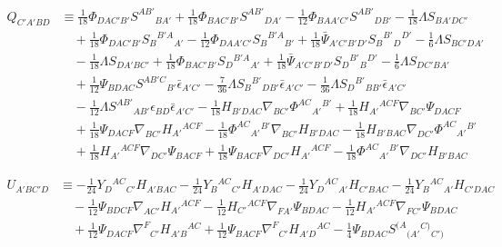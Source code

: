 \documentclass[10pt,a4paper]{article}
\theoremstyle{plain}
\begin{document}
\begin{align} 
Q_{C'A'BD} &\equiv \tfrac{1}{18} \Phi_{DAC'B'} S^{AB'}{}_{BA'} +
\tfrac{1}{18} \Phi_{BAC'B'} S^{AB'}{}_{DA'} - \tfrac{1}{12}
\Phi_{BAA'C'} S^{AB'}{}_{DB'} - \tfrac{1}{18} \Lambda S_{BA'DC'}
\nonumber \\ & \quad + \tfrac{1}{18} \Phi_{DAC'B'}
S_{B}{}^{B'A}{}_{A'} - \tfrac{1}{12} \Phi_{DAA'C'}
S_{B}{}^{B'A}{}_{B'} + \tfrac{1}{18} \bar{\Psi}_{A'C'B'D'}
S_{B}{}^{B'}{}_{D}{}^{D'} - \tfrac{1}{6} \Lambda S_{BC'DA'} \nonumber
\\ & \quad - \tfrac{1}{18} \Lambda S_{DA'BC'} + \tfrac{1}{18}
\Phi_{BAC'B'} S_{D}{}^{B'A}{}_{A'} + \tfrac{1}{18}
\bar{\Psi}_{A'C'B'D'} S_{D}{}^{B'}{}_{B}{}^{D'} - \tfrac{1}{6} \Lambda
S_{DC'BA'} \nonumber \\ & \quad + \tfrac{1}{12} \Psi_{BDAC}
S^{AB'C}{}_{B'} \bar{\epsilon}_{A'C'} - \tfrac{7}{36} \Lambda
S_{B}{}^{B'}{}_{DB'} \bar{\epsilon}_{A'C'} - \tfrac{1}{36} \Lambda
S_{D}{}^{B'}{}_{BB'} \bar{\epsilon}_{A'C'} \nonumber \\ & \quad -
\tfrac{1}{12} \Lambda S^{AB'}{}_{AB'}
\epsilon_{BD}\bar{\epsilon}_{A'C'} - \tfrac{1}{18} H_{B'DAC}
\nabla_{BC'}\Phi^{AC}{}_{A'}{}^{B'} + \tfrac{1}{18} H_{A'}{}^{ACF}
\nabla_{BC'}\Psi_{DACF} \nonumber \\ & \quad + \tfrac{1}{18}
\Psi_{DACF} \nabla_{BC'}H_{A'}{}^{ACF} - \tfrac{1}{18}
\Phi^{AC}{}_{A'}{}^{B'} \nabla_{BC'}H_{B'DAC} -\tfrac{1}{18} H_{B'BAC}
\nabla_{DC'}\Phi^{AC}{}_{A'}{}^{B'} \nonumber \\ & \quad +
\tfrac{1}{18} H_{A'}{}^{ACF} \nabla_{DC'}\Psi_{BACF} + \tfrac{1}{18}
\Psi_{BACF} \nabla_{DC'}H_{A'}{}^{ACF} - \tfrac{1}{18}
\Phi^{AC}{}_{A'}{}^{B'} \nabla_{DC'}H_{B'BAC} \nonumber
\end{align}

\begin{align}
 U_{A'BC'D} & \equiv - \tfrac{1}{24} Y_{D}{}^{AC}{}_{C'} H_{A'BAC} -
 \tfrac{1}{24} Y_{B}{}^{AC}{}_{C'} H_{A'DAC} - \tfrac{1}{24}
 Y_{D}{}^{AC}{}_{A'} H_{C'BAC} - \tfrac{1}{24} Y_{B}{}^{AC}{}_{A'}
 H_{C'DAC}  \nonumber \\ & \quad - \tfrac{1}{12} \Psi_{BDCF}
 \nabla_{AC'}H_{A'}{}^{ACF} - \tfrac{1}{12} H_{C'}{}^{ACF}
 \nabla_{FA'}\Psi_{BDAC} - \tfrac{1}{12} H_{A'}{}^{ACF}
 \nabla_{FC'}\Psi_{BDAC} \nonumber \\ & \quad + \tfrac{1}{12}
 \Psi_{DACF} \nabla^{F}{}_{C'}H_{A'B}{}^{AC} + \tfrac{1}{12}
 \Psi_{BACF} \nabla^{F}{}_{C'}H_{A'D}{}^{AC} - \tfrac{1}{4}
 \Psi_{BDAC} S^{(A}{}_{(A'}{}^{C)}{}_{C')}\nonumber
\end{align}
% 


%
\end{document}
